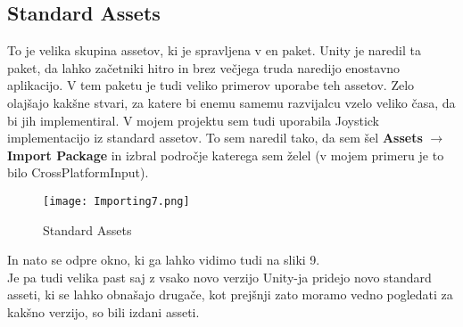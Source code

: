 {\color{indiagreen}\subsection{Standard Assets}}
To je velika skupina assetov, ki je spravljena v en paket. Unity je naredil ta paket, da lahko začetniki hitro in brez večjega truda naredijo enostavno aplikacijo. V tem paketu je tudi veliko primerov uporabe teh assetov. Zelo olajšajo kakšne stvari, za katere bi enemu samemu razvijalcu vzelo veliko časa, da bi jih implementiral. V mojem projektu sem tudi uporabila Joystick implementacijo iz standard assetov. To sem naredil tako, da sem šel \textbf{Assets} $\rightarrow$ \textbf{Import Package} in izbral področje katerega sem želel (v mojem primeru je to bilo CrossPlatformInput).\\
\begin{figure}[ht!]
	\centering
	\texttt{[image: Importing7.png]}
	\caption{Standard Assets}
\end{figure}
In nato se odpre okno, ki ga lahko vidimo tudi na sliki 9.\\
Je pa tudi velika past saj z vsako novo verzijo Unity-ja pridejo novo standard asseti, ki se lahko obnašajo drugače, kot prejšnji zato moramo vedno pogledati za kakšno verzijo, so bili izdani asseti.